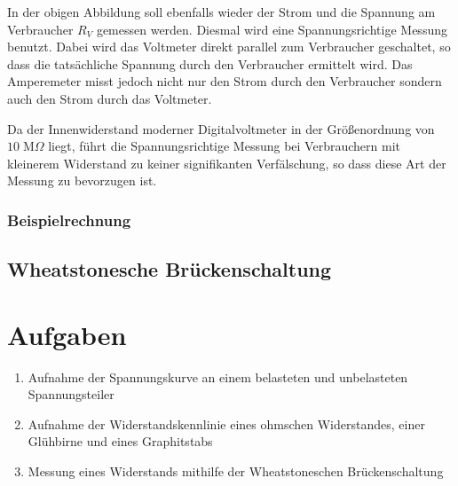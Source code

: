 \documentclass[a4paper,german,12pt,smallheadings]{scrartcl}
\begin{document}
In der obigen Abbildung soll ebenfalls wieder der Strom und die Spannung am
Verbraucher $R_V$ gemessen werden. Diesmal wird eine Spannungsrichtige Messung
benutzt. Dabei wird das Voltmeter direkt parallel zum Verbraucher geschaltet,
so dass die tatsächliche Spannung durch den Verbraucher ermittelt wird. Das
Amperemeter misst jedoch nicht nur den Strom durch den Verbraucher sondern auch
den Strom durch das Voltmeter.

Da der Innenwiderstand moderner Digitalvoltmeter in der Größenordnung von $10
\;\text{M}\Omega$ liegt, führt die Spannungsrichtige Messung bei Verbrauchern
mit kleinerem Widerstand zu keiner signifikanten Verfälschung, so dass diese
Art der Messung zu bevorzugen ist.


\subsubsection{Beispielrechnung}


\subsection{Wheatstonesche Brückenschaltung}

\section{Aufgaben}

\begin{enumerate}
  \item Aufnahme der Spannungskurve an einem belasteten und unbelasteten Spannungsteiler
  \item Aufnahme der Widerstandskennlinie eines ohmschen Widerstandes, einer Glühbirne und eines Graphitstabs
  \item Messung eines Widerstands mithilfe der Wheatstoneschen Brückenschaltung
\end{enumerate}
\end{document}
